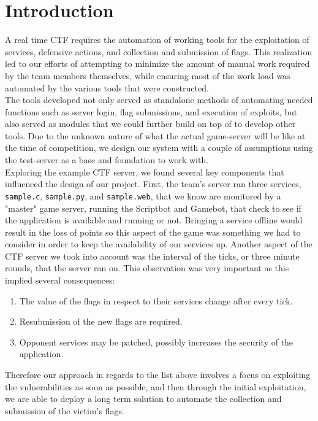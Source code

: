 \documentclass[12pt]{report}
\begin{document}
\section*{Introduction}
A real time CTF requires the automation of working tools for the exploitation of services, defensive actions, and collection and submission of flags. This realization led to our efforts of attempting to minimize the amount of manual work required by the team members themselves, while ensuring most of the work load was automated by the various tools that were constructed. \\

\noindent The tools developed not only served as standalone methods of automating needed functions such as server login, flag submissions, and execution of exploits, but also served as modules that we could further build on top of to develop other tools. Due to the unknown nature of what the actual game-server will be like at the time of competition, we design our system with a couple of assumptions using the test-server as a base and foundation to work with. \\

\noindent Exploring the example CTF server, we found several key components that influenced the design of our project. First, the team's server ran three services, \texttt{sample.c}, \texttt{sample.py}, and \texttt{sample.web}, that we know are monitored by a "master" game server, running the Scriptbot and Gamebot, that check to see if the application is available and running or not. Bringing a service offline would result in the loss of points so this aspect of the game was something we had to consider in order to keep the availability of our services up. Another aspect of the CTF server we took into account was the interval of the ticks, or three minute rounds, that the server ran on. This observation was very important as this implied several consequences: \\

\begin{enumerate}
	\item The value of the flags in respect to their services change after every tick.
	\item Resubmission of the new flags are required.
	\item Opponent services may be patched, possibly increases the security of the application.
	
\end{enumerate}
Therefore our approach in regards to the list above involves a focus on exploiting the vulnerabilities as soon as possible, and then through the initial exploitation, we are able to deploy a long term solution to automate the collection and submission of the victim's flags. \\
\end{document}
